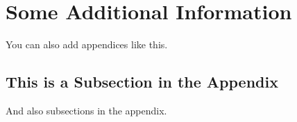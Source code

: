 \section{Some Additional Information}
\label{sec:two:appendix}

You can also add appendices like this.

\subsection{This is a Subsection in the Appendix}

And also subsections in the appendix.